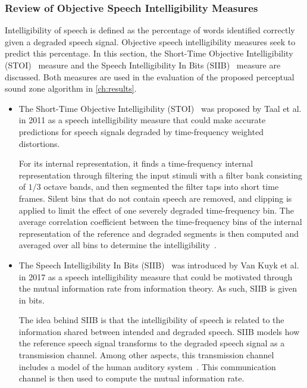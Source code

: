 \subsubsection{Review of Objective Speech Intelligibility Measures}
Intelligibility of speech is defined as the percentage of words identified correctly given a degraded speech signal.
Objective speech intelligibility measures seek to predict this percentage.
In this section, the Short-Time Objective Intelligibility (STOI)~\cite{taal2011algorithm} measure and the 
Speech Intelligibility In Bits (SIIB)~\cite{van2017instrumental} measure are discussed.
Both measures are used in the evaluation of the proposed perceptual sound zone algorithm in \autoref{ch:results}.

\begin{itemize}
    \item 
    The Short-Time Objective Intelligibility (STOI)~\cite{taal2011algorithm} was proposed by Taal et al. 
    in 2011 as a speech intelligibility measure that could make accurate predictions for speech signals degraded by time-frequency weighted distortions.

    For its internal representation, it finds a time-frequency internal representation through filtering the input stimuli with a filter bank consisting of $1/3$ octave bands, and then segmented the filter taps into short time frames.
    Silent bins that do not contain speech are removed, and clipping is applied to limit the 
    effect of one severely degraded time-frequency bin.
    The average correlation coefficient between the time-frequency bins of the internal representation of the reference and degraded segments is then computed and averaged over all bins to determine the intelligibility~\cite{taal2011algorithm}.

    \item 
    The Speech Intelligibility In Bits (SIIB)~\cite{van2017instrumental} was introduced by Van Kuyk et al.
    in 2017 as a speech intelligibility measure that could be motivated through
    the mutual information rate from information theory.
    As such, SIIB is given in bits.

    The idea behind SIIB is that the intelligibility of speech is related to the information shared between 
    intended and degraded speech.
    SIIB models how the reference speech signal transforms to the degraded speech signal as a transmission channel.
    Among other aspects, this transmission channel includes a model of the human auditory system~\cite{van2017instrumental}.
    This communication channel is then used to compute the mutual information rate.
\end{itemize}

